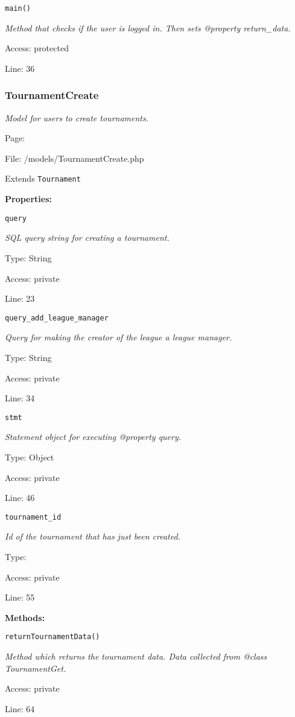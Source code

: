 \texttt{main()}

{\scriptsize
\textit{Method that checks if the user is logged in.
Then sets @property return\_data.}

Access: protected

Line: 36

}

\subsubsection{TournamentCreate}\label{TournamentCreate.php.doc}
\textit{Model for users to create tournaments.}

Page: \pageref{TournamentCreate.php}

File: /models/TournamentCreate.php

Extends \texttt{Tournament}

\textbf{Properties:}

\texttt{query}

{\scriptsize
\textit{SQL query string for creating a tournament.}

Type: String

Access: private

Line: 23

}
\texttt{query\_add\_league\_manager}

{\scriptsize
\textit{Query for making the creator of the league a league manager.}

Type: String

Access: private

Line: 34

}
\texttt{stmt}

{\scriptsize
\textit{Statement object for executing @property query.}

Type: Object

Access: private

Line: 46

}
\texttt{tournament\_id}

{\scriptsize
\textit{Id of the tournament that has just been created.}

Type: 

Access: private

Line: 55

}
\textbf{Methods:}

\texttt{returnTournamentData()}

{\scriptsize
\textit{Method which returns the tournament data.
Data collected from @class TournamentGet.}

Access: private

Line: 64

}

